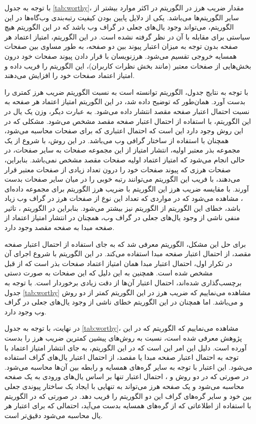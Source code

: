 \documentclass[twoside, a4paper,11pt]{book}
\numberwithin{equation}{chapter}
\numberwithin{table}{chapter}
\numberwithin{figure}{chapter}
\numberwithin{equation}{chapter}
\begin{document}
با توجه به جدول \ref{tab:worthy}، مقدار ضریب هرز در الگوریتم  در اکثر موارد بیشتر از سایر الگوریتم‌ها می‌باشد. یکی از دلایل پایین بودن کیفیت رتبه‌بندی وب‌گاه‌ها در این الگوریتم، می‌تواند وجود یال‌های جعلی در گراف وب باشد که در این الگوریتم هیچ سیاستی برای مقابله با آن در نظر گرفته نشده است. در این الگوریتم، امتیاز اعتماد هر صفحه بدون توجه به میزان اعتبار پیوند بین دو صفحه، به طور مساوی بین صفحات همسایه خروجی تقسیم می‌شود. هرزنویسان با قرار دادن پیوند صفحات خود درون بخش‌هایی از صفحات معتبر (مانند بخش نظرات کاربران)، این الگوریتم را فریب داده و امتیاز اعتماد صفحات خود را افزایش می‌دهند. 

با توجه به نتایج جدول، الگوریتم  توانسته است به نسبت الگوریتم  ضریب هرز کمتری را بدست آورد. همان‌طور که توضیح داده شد، در این الگوریتم امتیاز اعتماد هر صفحه به نسبت احتمال اعتبار صفحه مقصد انتشار داده می‌شود. به عبارت دیگر، وزن یک یال در این الگوریتم، با استفاده از احتمال اعتبار صفحه مقصد مشخص می‌شود. مشکلی که در این روش وجود دارد این است که احتمال اعتباری که برای صفحات محاسبه می‌شود، همچنان با استفاده از ساختار گرافی وب می‌باشد. در این روش، با شروع از یک مجموعه بذر معتبر اولیه، انتشار امتیاز از این مجموعه صفحات به سایر صفحات، در حالی انجام می‌شود که امتیاز اعتماد اولیه صفحات مقصد مشخص نمی‌باشد. بنابراین، صفحات هرزی که پیوند صفحات خود را درون تعداد زیادی از صفحات معتبر قرار می‌دهند، با فریب این الگوریتم می‌توانند رتبه خوبی را در میان سایر صفحات بدست آورند. با مقایسه ضریب هرز این الگوریتم با ضریب هرز الگوریتم  برای مجموعه داده‌ای ، مشاهده می‌شود که در مواردی که تعداد این نوع از صفحات هرز در گراف وب زیاد باشد، خطای این الگوریتم از الگوریتم  نیز بیشتر می‌شود. بنابراین در الگوریتم ، تاثیر منفی ناشی از وجود یال‌های جعلی در گراف وب، همچنان در انتشار امتیاز اعتماد از صفحه مبدا به صفحه مقصد وجود دارد.

برای حل این مشکل، الگوریتم  معرفی شد که به جای استفاده از احتمال اعتبار صفحه مقصد، از احتمال اعتبار صفحه مبدا استفاده می‌کند. در این الگوریتم با شروع اجرای آن در تکرار اول، احتمال اعتبار مبدا همان امتیاز اعتماد صفحات بذر است که از قبل مشخص شده است. همچنین به این دلیل که این‌ صفحات به صورت دستی برچسب‌گذاری شده‌اند، احتمال اعتبار آن‌ها از دقت زیادی برخوردار است. با توجه به جدول \ref{tab:worthy} مشاهده می‌نماییم که ضریب هرز در این الگوریتم کمتر از دو روش  و   می‌باشد. اما همچنان در این الگوریتم خطای ناشی از وجود یال‌‌های جعلی در گراف وب وجود دارد. 

در نهایت، با توجه به جدول \ref{tab:worthy}، مشاهده می‌نماییم که الگوریتم  که در این پژوهش معرفی شده است، نسبت به روش‌های پیشین کمترین ضریب هرز را بدست آورده است. دلیل این امر این است که در این الگوریتم، به جای انتشار امتیاز اعتماد با توجه به احتمال اعتبار صفحه مبدا یا مقصد، از احتمال اعتبار یال‌های گراف استفاده می‌شود. این اعتبار با توجه به سایر گره‌های همسایه و رابطه بین آن‌ها محاسبه می‌شود. در صورتی که در دو روش  و ، احتمال اعتبار تنها بر اساس یال‌های ورودی به یک صفحه محاسبه می‌شود و یک صفحه هرز می‌تواند به تنهایی با ایجاد یک ساختار پیوندی جعلی بین خود و سایر گره‌های گراف این دو الگوریتم را فریب دهد. در صورتی که در الگوریتم  با استفاده از اطلاعاتی که از گره‌های همسایه بدست می‌آید، احتمالی که برای اعتبار هر یال محاسبه می‌شود دقیق‌تر است.
\end{document}

